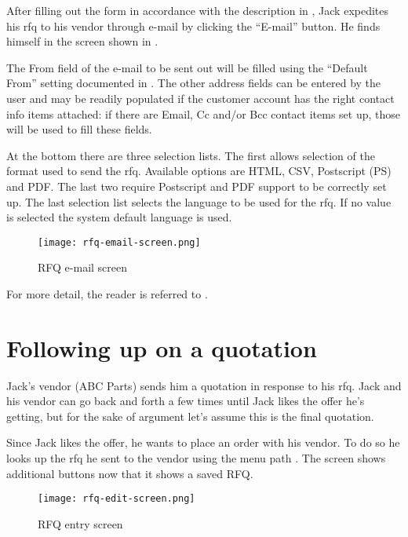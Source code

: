 After filling out the form in accordance with the description in ,
Jack expedites his \gls{rfq} to his vendor through e-mail by clicking the ``E-mail'' button. He finds
himself in the screen shown in .

The From field of the e-mail to be sent out will be filled using the ``Default From'' setting documented
in . The other address fields can be entered by the user and may be readily
populated if the customer account has the right contact info items attached: if there are Email, Cc and/or
Bcc contact items set up, those will be used to fill these fields.

At the bottom there are three selection lists. The first allows selection of the format used to send the
\gls{rfq}. Available options are HTML, CSV, Postscript (PS) and PDF. The last two require Postscript and PDF
support to be correctly set up. The last selection list selects the language to be used for the
\gls{rfq}. If no value is selected the system default language is used.

\begin{figure}[h]
\centering
\texttt{[image: rfq-email-screen.png]}
\caption{RFQ e-mail screen}
\label{fig:rfq-email-screen}
\end{figure}

For more detail, the reader is referred to .


\section{Following up on a quotation}
\label{sec-stock-quotation-followup}

Jack's vendor (ABC Parts) sends him a quotation in response to his \gls{rfq}. Jack and his vendor
can go back and forth a few times until Jack likes the offer he's getting, but for the sake of
argument let's assume this is the final quotation.

Since Jack likes the offer, he wants to place an order with his vendor. To do so he looks up the
\gls{rfq} he sent to the vendor using the menu path .
The screen shows additional buttons now that it shows a saved RFQ.


\begin{figure}[h]
\centering
\texttt{[image: rfq-edit-screen.png]}
\caption{RFQ entry screen}
\label{fig:bus-rfq-edit-screen}
\end{figure}


